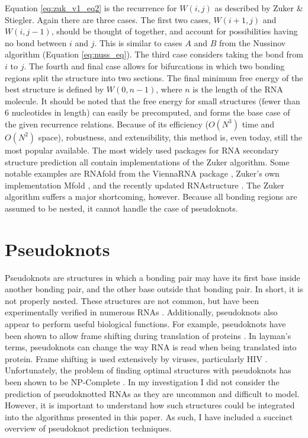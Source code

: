 \documentclass{cshonours}
\begin{document}
Equation \ref{eq:zuk_v1_eq2} is the recurrence for $W(i, j)$ as described by Zuker \& Stiegler.
Again there are three cases. The first two cases, $W (i + 1, j)$ and $W(i, j - 1)$,
should be thought of together, and account for possibilities having no bond between $i$ and $j$. This is similar to cases $A$ and $B$ from the Nussinov algorithm (Equation \ref{eq:nuss_eq}). The third case considers taking the bond from
$i$ to $j$. The fourth and final case allows for bifurcations in which two bonding regions split
the structure into two sections. The final minimum free energy of the best structure is defined by $W(0, n-1)$, where $n$ is the length of the RNA molecule. It should
be noted that the free energy for small structures (fewer than 6 nucleotides in length) can easily be
precomputed, and forms the base case of the given recurrence relations. Because of
its efficiency ($O(N^3)$ time and $O(N^2)$ space), robustness, and extensibility, this method is,
even today, still the most popular available. The most widely used packages for RNA secondary structure prediction all contain implementations of the Zuker algorithm. Some notable examples are RNAfold from the ViennaRNA package \cite{lorenz2011viennarna}, Zuker's own implementation Mfold \cite{zuker2003mfold}, and the recently updated RNAstructure \cite{bellaousov2013rnastructure}. The Zuker algorithm suffers a major shortcoming, however. Because all bonding regions are assumed to be nested, it
cannot handle the case of pseudoknots. 


\section{Pseudoknots}

Pseudoknots are structures in which a bonding pair may have its first
base inside another bonding pair, and the other base outside that bonding pair.
In short, it is not properly nested. These structures are not common,
but have been experimentally verified in numerous RNAs \cite{taufer2009pseudobase}. Additionally, pseudoknots also appear to perform useful biological functions. For
example, pseudoknots have been shown to allow frame shifting during translation
of proteins \cite{namy2006mechanical}. In layman's terms, pseudoknots can change the way RNA is read
when being translated into protein. Frame shifting is used extensively by
viruses, particularly HIV \cite{namy2006mechanical}. Unfortunately, the problem of finding optimal
structures with pseudoknots has been shown to be NP-Complete \cite{lyngso2000rna}. In my investigation I did not consider the prediction of pseudoknotted RNAs as they are uncommon and difficult to model. However, it is important to understand how such structures could be integrated into the algorithms presented in this paper. As such, I have included a succinct overview of pseudoknot prediction techniques.
\end{document}
